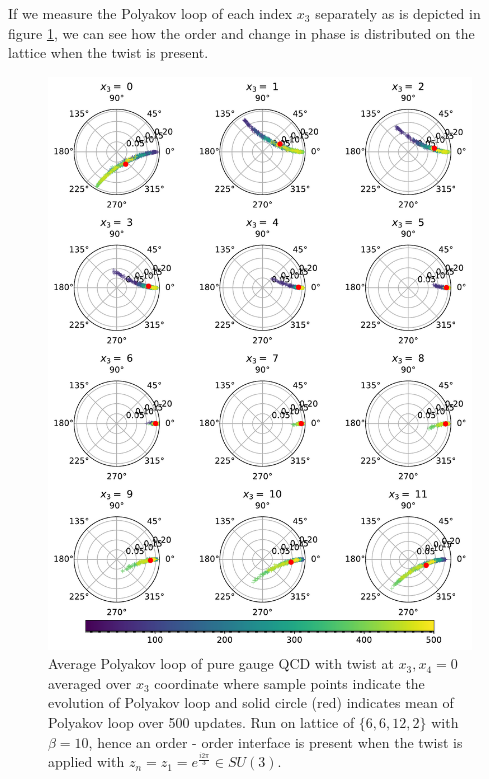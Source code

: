 \documentclass[english,twoside,openright]{UH_TCM_MSc}
\begin{document}
If we measure the Polyakov loop of each index $x_3$ separately as is depicted in figure \ref{fig:su3_twist_order}, we can see how the order and change in phase is distributed on the lattice when the twist is present. 
\begin{figure}[htpb]
    \centering
    \includegraphics[width=1\textwidth]{final_plots/misc/z_index_surface.pdf}
    \caption{Average Polyakov loop of pure gauge QCD with twist at $x_3,x_4 = 0$ averaged over $x_3$ coordinate where sample points indicate the evolution of Polyakov loop and solid circle (red) indicates mean of Polyakov loop over 500 updates. Run on lattice of $\{6,6,12,2\}$ with $\beta = 10$, hence an order - order interface is present when the twist is applied with $z_n = z_1 = e^{\frac{i2\pi}{3}} \in SU(3)$.}
    \label{fig:su3_twist_order}
\end{figure}
\end{document}
